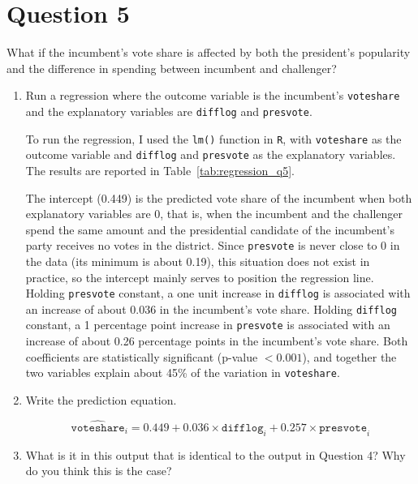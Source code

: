 \documentclass[12pt,letterpaper]{article}
\begin{document}
	\section*{Question 5}
	\noindent What if the incumbent's vote share is affected by both the president's popularity and the difference in spending between incumbent and challenger? 
	\begin{enumerate}
		\item Run a regression where the outcome variable is the incumbent's \texttt{voteshare} and the explanatory variables are \texttt{difflog} and \texttt{presvote}.
		
		\noindent To run the regression, I used the \texttt{lm()} function in \texttt{R}, with \texttt{voteshare} as the outcome variable and \texttt{difflog} and \texttt{presvote} as the explanatory variables. The results are reported in Table~\ref{tab:regression_q5}.
		
		
		
		
		
		\noindent The intercept (0.449) is the predicted vote share of the incumbent when both explanatory variables are 0, that is, when the incumbent and the challenger spend the same amount and the presidential candidate of the incumbent's party receives no votes in the district. Since \texttt{presvote} is never close to 0 in the data (its minimum is about 0.19), this situation does not exist in practice, so the intercept mainly serves to position the regression line. Holding \texttt{presvote} constant, a one unit increase in \texttt{difflog} is associated with an increase of about 0.036 in the incumbent's vote share. Holding \texttt{difflog} constant, a 1 percentage point increase in \texttt{presvote} is associated with an increase of about 0.26 percentage points in the incumbent's vote share. Both coefficients are statistically significant (p-value $< 0.001$), and together the two variables explain about 45\% of the variation in \texttt{voteshare}.
		
		\item Write the prediction equation.
		
		\[
		\widehat{\texttt{voteshare}}_i = 0.449 + 0.036 \times \texttt{difflog}_i + 0.257 \times \texttt{presvote}_i
		\]
		
		\item What is it in this output that is identical to the output in Question 4? Why do you think this is the case?
		

\end{enumerate}
\end{document}
